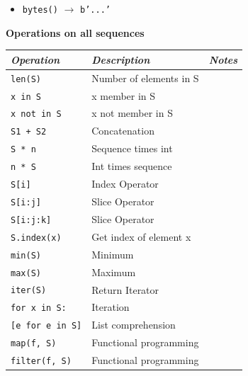 \documentclass[9pt,a4wide]{extarticle}
\begin{document}
\begin{itemize}
\item {\tt bytes()} $\rightarrow$ {\tt b'...'}
\end{itemize}




\bigskip
{\bf Operations on all sequences}
{}

\begin{supertabular}{|l|p{12cm}|c|}\hline
{\em Operation}      & {\em Description}        &  {\em Notes} \\ \hline\hline

{\tt len(S)}         & Number of elements in S  &        \\ \hline
{\tt x in S}         & x member in S            &        \\ \hline
{\tt x not in S}     & x not member in S        &        \\ \hline
{\tt S1 + S2}        & Concatenation                       &        \\ \hline
{\tt S * n}          & Sequence times int                  &        \\ \hline
{\tt n * S}          & Int times sequence                  &        \\ \hline
{\tt S[i]}           & Index Operator                      &        \\ \hline
{\tt S[i:j]}         & Slice Operator                      &        \\ \hline
{\tt S[i:j:k]}       & Slice Operator                      &        \\ \hline
{\tt S.index(x)}     & Get index of element x              &        \\ \hline
{\tt min(S)}         & Minimum                             &        \\ \hline
{\tt max(S)}         & Maximum                             &        \\ \hline
{\tt iter(S)}        & Return Iterator                     &        \\ \hline
{\tt for x in S:}    & Iteration                           &        \\ \hline
{\tt [e for e in S]} & List comprehension                  &        \\ \hline
{\tt map(f, S)}      & Functional programming              &        \\ \hline
{\tt filter(f, S)}   & Functional programming              &        \\ \hline
\end{supertabular}
\end{document}
